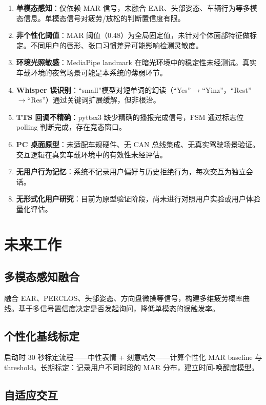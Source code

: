 \documentclass[12pt,a4paper]{ctexart}
\begin{document}
\begin{enumerate}[label=\arabic*.]
    \item \textbf{单模态感知}：仅依赖 MAR 信号，未融合 EAR、头部姿态、车辆行为等多模态信息。单模态信号对疲劳/放松的判断置信度有限。
    \item \textbf{非个性化阈值}：MAR 阈值（0.48）为全局固定值，未针对个体面部特征做标定。不同用户的唇形、张口习惯差异可能影响检测灵敏度。
    \item \textbf{环境光照敏感}：MediaPipe landmark 在暗光环境中的稳定性未经测试。真实车载环境的夜驾场景可能是本系统的薄弱环节。
    \item \textbf{Whisper 误识别}：“small”模型对短单词的幻读（“Yes”$\rightarrow$“Yinz”，“Rest”$\rightarrow$“Res”）通过关键词扩展缓解，但非根治。
    \item \textbf{TTS 回调不精确}：pyttsx3 缺少精确的播报完成信号，FSM 通过标志位 polling 判断完成，存在竞态窗口。
    \item \textbf{PC 桌面原型}：未适配车规硬件、无 CAN 总线集成、无真实驾驶场景验证。交互逻辑在真实车载环境中的有效性未经评估。
    \item \textbf{无用户行为记忆}：系统不记录用户偏好与历史拒绝行为，每次交互为独立会话。
    \item \textbf{无形式化用户研究}：目前为原型验证阶段，尚未进行对照用户实验或用户体验量化评估。
\end{enumerate}

\section{未来工作}

\subsection{多模态感知融合}

融合 EAR、PERCLOS、头部姿态、方向盘微操等信号，构建多维疲劳概率曲线。基于多信号置信度决定是否发起询问，降低单模态的误触发率。

\subsection{个性化基线标定}

启动时 30 秒标定流程——中性表情 + 刻意哈欠——计算个性化 MAR baseline 与 threshold。长期标定：记录用户不同时段的 MAR 分布，建立时间-唤醒度模型。

\subsection{自适应交互}
\end{document}
